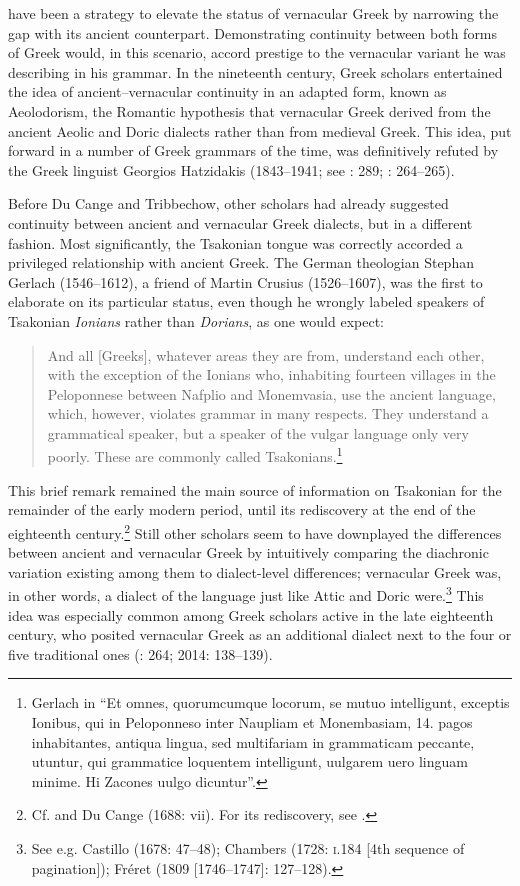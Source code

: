 have been a strategy to elevate the status of vernacular Greek by narrowing the gap with its ancient counterpart. Demonstrating continuity between both forms of Greek would, in this scenario, accord prestige to the vernacular variant he was describing in his grammar. In the nineteenth century, Greek scholars entertained the idea of ancient–vernacular continuity in an adapted form, known as Aeolodorism, the Romantic hypothesis that vernacular Greek derived from the ancient Aeolic and Doric dialects rather than from medieval Greek. This idea, put forward in a number of Greek grammars of the time, was definitively refuted by the Greek linguist Georgios Hatzidakis (1843–1941; see \citealt{Argyropoulos2009}: 289; \citealt{Mackridge2009}: 264–265).

Before Du Cange and Tribbechow, other scholars had already suggested continuity between ancient and vernacular Greek dialects, but in a different fashion. Most significantly, the Tsakonian tongue was correctly accorded a privileged relationship with ancient Greek. The German theologian Stephan Gerlach (1546–1612), a friend of Martin Crusius (1526–1607), was the first to elaborate on its particular status, even though he wrongly labeled speakers of Tsakonian \textit{Ionians} rather than \textit{Dorians}, as one would expect:

\begin{quote}
And all [Greeks], whatever areas they are from, understand each other, with the exception of the Ionians who, inhabiting fourteen villages in the Peloponnese between Nafplio and Monemvasia, use the ancient language, which, however, violates grammar in many respects. They understand a grammatical speaker, but a speaker of the vulgar language only very poorly. These are commonly called Tsakonians.\footnote{Gerlach in \citet[489]{Crusius1584} “Et omnes, quorumcumque locorum, se mutuo intelligunt, exceptis Ionibus, qui in Peloponneso inter Naupliam et Monembasiam, 14. pagos inhabitantes, antiqua lingua, sed multifariam in grammaticam peccante, utuntur, qui grammatice loquentem intelligunt, uulgarem uero linguam minime. Hi Zacones uulgo dicuntur”.}
\end{quote}

This brief remark remained the main source of information on Tsakonian for the remainder of the early modern period, until its rediscovery at the end of the eighteenth century.\footnote{Cf. \citet[44]{Howell1650a} and Du Cange (1688: vii). For its rediscovery, see \citet{Famerie2007}.} Still other scholars seem to have downplayed the differences between ancient and vernacular Greek by intuitively comparing the diachronic variation existing among them to dialect-level differences; vernacular Greek was, in other words, a dialect of the language just like Attic and Doric were.\footnote{See e.g. Castillo (1678: 47–48); Chambers (1728: \textsc{i.}184 [4th sequence of pagination]); Fréret (1809 [1746–1747]: 127–128).} This idea was especially common among Greek scholars active in the late eighteenth century, who posited vernacular Greek as an additional dialect next to the four or five traditional ones (\citealt{Mackridge2009}: 264; 2014: 138–139).

